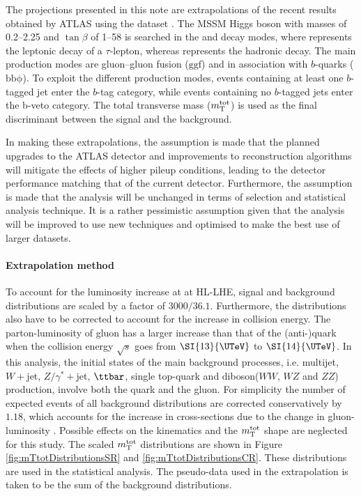 The projections presented in this note are extrapolations of the recent results obtained by ATLAS
using the \RunTwo dataset \cite{ATLASRun2Ditau}.  The MSSM Higgs boson with masses of 
0.2--\SI{2.25}{\UTeV} and $\tan\beta$ of 1--58 is searched in the \lephad and \hadhad decay modes, 
where \taulep represents the leptonic decay of a $\tau$-lepton, whereas \tauhad represents 
the hadronic decay. The main production modes are gluon--gluon fusion ($\mathrm{ggf}$) and in association 
with $b$-quarks ($\mathrm{bb\phi}$).  
To exploit the different production modes, events containing at least one $b$-tagged jet enter 
the $b$-tag category, while events containing no $b$-tagged jets enter the b-veto category.
The total transverse mass ($m_\textnormal{T}^\textnormal{tot}$) is used as the final discriminant between the signal and the background. 

In making these extrapolations, the assumption is made that the planned upgrades to the ATLAS detector 
and improvements to reconstruction algorithms will mitigate the effects of higher pileup conditions, 
leading to the detector performance matching that of the current detector. Furthermore, the assumption 
is made that the analysis will be unchanged in terms of selection and statistical analysis technique. 
It is a rather pessimistic assumption given that the analysis will be improved to use new techniques 
and optimised to make the best use of larger datasets.

\paragraph{Extrapolation method}
\label{sec:extrapolation method}
To account for the luminosity increase at at HL-LHE, signal and background distributions are scaled 
by a factor of $3000/36.1$.
Furthermore, the distributions also have to be corrected to account for the increase in collision energy. 
The parton-luminosity of gluon has a larger increase than that of the (anti-)quark when the collision energy 
$\sqrt{s}$ goes from $\SI{13}{\UTeV}$ to $\SI{14}{\UTeV}$.
In this analysis, the initial states of the main background processes, i.e. multijet, $W+$jet, $Z/\gamma^{*}+$jet, $\ttbar$, 
single top-quark and diboson($WW$, $WZ$ and $ZZ$) production, involve both the quark and the gluon. 
For simplicity the number of expected events of all background distributions are corrected conservatively by $1.18$, 
which accounts for the increase in cross-sections due to the change in gluon-luminosity \cite{Heinemeyer:2013tqa}. 
Possible effects on the kinematics and the $m_\textnormal{T}^\textnormal{tot}$ shape are neglected for this study. The scaled $m_\textnormal{T}^\textnormal{tot}$ 
distributions are shown in Figure \ref{fig:mTtotDistributionsSR} and \ref{fig:mTtotDistributionsCR}. 
These distributions are used in the statistical analysis. The pseudo-data used in the extrapolation is 
taken to be the sum of the background distributions.

